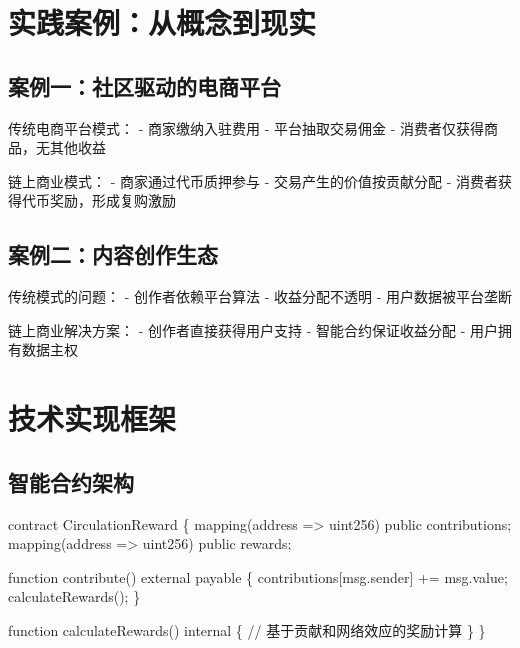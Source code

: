 \documentclass[
  Letterpaper,
]{scrbook}
\newenvironment{Shaded}{\begin{snugshade}}{\end{snugshade}}
\newcommand{\NormalTok}[1]{\textcolor[rgb]{0.00,0.23,0.31}{#1}}
\begin{document}
\section{实践案例：从概念到现实}\label{ux5b9eux8df5ux6848ux4f8bux4eceux6982ux5ff5ux5230ux73b0ux5b9e}

\subsection{案例一：社区驱动的电商平台}\label{ux6848ux4f8bux4e00ux793eux533aux9a71ux52a8ux7684ux7535ux5546ux5e73ux53f0}

传统电商平台模式： - 商家缴纳入驻费用 - 平台抽取交易佣金 -
消费者仅获得商品，无其他收益

链上商业模式： - 商家通过代币质押参与 - 交易产生的价值按贡献分配 -
消费者获得代币奖励，形成复购激励

\subsection{案例二：内容创作生态}\label{ux6848ux4f8bux4e8cux5185ux5bb9ux521bux4f5cux751fux6001}

传统模式的问题： - 创作者依赖平台算法 - 收益分配不透明 -
用户数据被平台垄断

链上商业解决方案： - 创作者直接获得用户支持 - 智能合约保证收益分配 -
用户拥有数据主权

\section{技术实现框架}\label{ux6280ux672fux5b9eux73b0ux6846ux67b6}

\subsection{智能合约架构}\label{ux667aux80fdux5408ux7ea6ux67b6ux6784}

\begin{Shaded}
\begin{Highlighting}[]
\NormalTok{contract CirculationReward \{}
\NormalTok{    mapping(address =\textgreater{} uint256) public contributions;}
\NormalTok{    mapping(address =\textgreater{} uint256) public rewards;}
    
\NormalTok{    function contribute() external payable \{}
\NormalTok{        contributions[msg.sender] += msg.value;}
\NormalTok{        calculateRewards();}
\NormalTok{    \}}
    
\NormalTok{    function calculateRewards() internal \{}
\NormalTok{        // 基于贡献和网络效应的奖励计算}
\NormalTok{    \}}
\NormalTok{\}}
\end{Highlighting}
\end{Shaded}
\end{document}
